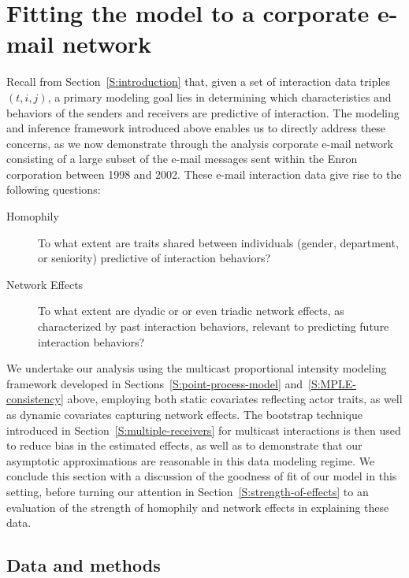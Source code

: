 \documentclass[final]{statsoc}
\begin{document}
\section{Fitting the model to a corporate e-mail network}\label{S:enron-modeling}

Recall from Section~\ref{S:introduction} that, given a set of interaction data triples $(t,i,j)$, a primary modeling goal lies in determining which characteristics and behaviors of the senders and receivers are predictive of interaction.  The modeling and inference framework introduced above enables us to directly address these concerns, as we now demonstrate through the analysis corporate e-mail network consisting of a large subset of the e-mail messages sent within the Enron corporation between 1998 and 2002.  These e-mail interaction data give rise to the following questions:

\begin{description}
    \item[Homophily] To what extent are traits shared between individuals (gender, department, or seniority) predictive of interaction behaviors?

    \item[Network Effects] To what extent are dyadic or or even triadic network effects, as characterized by past interaction behaviors, relevant to predicting future interaction behaviors?
\end{description}

We undertake our analysis using the multicast proportional intensity modeling framework developed in Sections~\ref{S:point-process-model} and~\ref{S:MPLE-consistency} above, employing both static covariates reflecting actor traits, as well as dynamic covariates capturing network effects.  The bootstrap technique introduced in Section~\ref{S:multiple-receivers} for multicast interactions is then used to reduce bias in the estimated effects, as well as to demonstrate that our asymptotic approximations are reasonable in this data modeling regime.  We conclude this section with a discussion of the goodness of fit of our model in this setting, before turning our attention in Section~\ref{S:strength-of-effects} to an evaluation of the strength of homophily and network effects in explaining these data.

\subsection{Data and methods}
\end{document}
